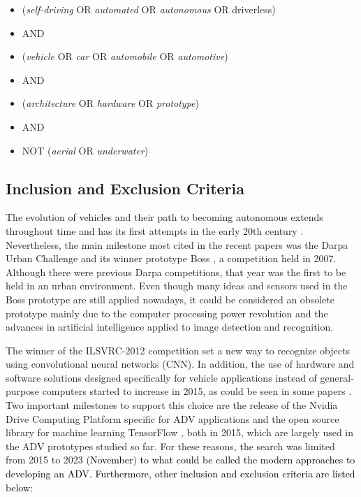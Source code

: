 \documentclass[lettersize,journal]{IEEEtran}
\begin{document}
\begin{itemize}
    \item[] \center (\textit{self-driving} OR \textit{automated} OR \textit{autonomous} OR {driverless})
    \item[] \center AND
    \item[] (\textit{vehicle} OR \textit{car} OR \textit{automobile} OR \textit{automotive}) 
    \item[] \center AND
    \item[] (\textit{architecture} OR \textit{hardware} OR \textit{prototype})
    \item[] \center AND
    \item[] NOT (\textit{aerial} OR \textit{underwater})
\end{itemize}


\subsection{Inclusion and Exclusion Criteria} \label{InclusionExclusionCriteria}

The evolution of vehicles and their path to becoming autonomous extends throughout time and has its first attempts in the early 20th century \cite{Bimbraw2015}. Nevertheless, the main milestone most cited in the recent papers was the Darpa Urban Challenge and its winner prototype Boss \cite{Urmson2008}, a competition held in 2007. Although there were previous Darpa competitions, that year was the first to be held in an urban environment. Even though many ideas and sensors used in the Boss prototype are still applied nowadays, it could be considered an obsolete prototype mainly due to the computer processing power revolution and the advances in artificial intelligence applied to image detection and recognition.

The winner of the ILSVRC-2012 competition \cite{Krizhevsky2017} set a new way to recognize objects using convolutional neural networks (CNN). In addition, the use of hardware and software solutions designed specifically for vehicle applications instead of general-purpose computers started to increase in 2015, as could be seen in some papers \cite{Wang2017,Lin2018,Liu2017,Oh2019}. Two important milestones to support this choice are the release of the Nvidia Drive Computing Platform \cite{NvidiaDrive} specific for ADV applications and the open source library for machine learning TensorFlow \cite{TensorFlow}, both in 2015, which are largely used in the ADV prototypes studied so far. For these reasons, the search was limited from 2015 to 2023 (\textcolor{black} {November}) \textcolor{black}{to what could be called the modern approaches to developing an ADV. Furthermore, other inclusion and exclusion criteria are listed below:}\\
\end{document}
